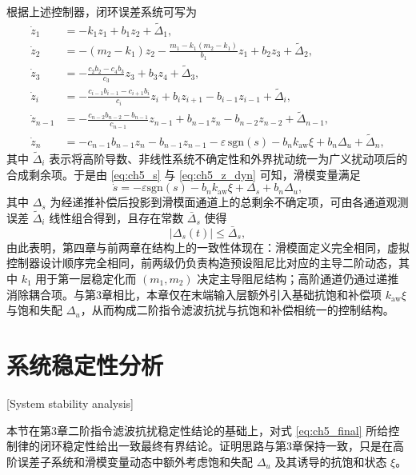 根据上述控制器，闭环误差系统可写为
\begin{subequations}\label{eq:ch5_z_dyn}
\begin{align}
  \dot z_1 &= -k_1z_1+b_1z_2+\tilde\Delta_1,\\
  \dot z_2 &= -(m_2-k_1)z_2-\frac{m_1-k_1(m_2-k_1)}{b_1}z_1+b_2z_3+\tilde\Delta_2,\\
  \dot z_3 &= -\frac{c_2b_2-c_4b_3}{c_3}z_3+b_3z_4+\tilde\Delta_3,\\
  \dot z_i &= -\frac{c_{i-1}b_{i-1}-c_{i+1}b_i}{c_i}z_i+b_iz_{i+1}-b_{i-1}z_{i-1}+\tilde\Delta_i,\\
  \dot z_{n-1} &= -\frac{c_{n-2}b_{n-2}-b_{n-1}}{c_{n-1}}z_{n-1}+b_{n-1}z_n-b_{n-2}z_{n-2}+\tilde\Delta_{n-1},\\
  \dot z_n &= -c_{n-1}b_{n-1}z_n-b_{n-1}z_{n-1}
             -\varepsilon\,\mathrm{sgn}(s)
             -b_nk_{\mathrm{aw}}\xi+b_n\Delta_u+\tilde\Delta_n,
\end{align}
\end{subequations}
其中 $\tilde\Delta_i$ 表示将高阶导数、非线性系统不确定性和外界扰动统一为广义扰动项后的合成剩余项。于是由 \eqref{eq:ch5_s} 与 \eqref{eq:ch5_z_dyn} 可知，滑模变量满足
\begin{equation}\label{eq:ch5_sdot_expand}
  \dot s
  =-\varepsilon\mathrm{sgn}(s)-b_nk_{\mathrm{aw}}\xi+\Delta_s+b_n\Delta_u,
\end{equation}
其中 $\Delta_s$ 为经递推补偿后投影到滑模面通道上的总剩余不确定项，可由各通道观测误差 $\tilde\Delta_i$ 线性组合得到，且存在常数 $\bar\Delta_s$ 使得
\begin{equation}
|\Delta_s(t)|\le \bar\Delta_s,
\end{equation}
\noindent
由此表明，第四章与前两章在结构上的一致性体现在：滑模面定义完全相同，虚拟控制器设计顺序完全相同，前两级仍负责构造预设阻尼比对应的主导二阶动态，其中 $k_1$ 用于第一层稳定化而 $(m_1,m_2)$ 决定主导阻尼结构；高阶通道仍通过递推消除耦合项。与第3章相比，本章仅在末端输入层额外引入基础抗饱和补偿项 $k_{\mathrm{aw}}\xi$ 与饱和失配 $\Delta_u$，从而构成二阶指令滤波抗扰与抗饱和补偿相统一的控制结构。
\section{系统稳定性分析}[System stability analysis]

本节在第3章二阶指令滤波抗扰稳定性结论的基础上，对式 \eqref{eq:ch5_final} 所给控制律的闭环稳定性给出一致最终有界结论。证明思路与第3章保持一致，只是在高阶误差子系统和滑模变量动态中额外考虑饱和失配 $\Delta_u$ 及其诱导的抗饱和状态 $\xi$。

